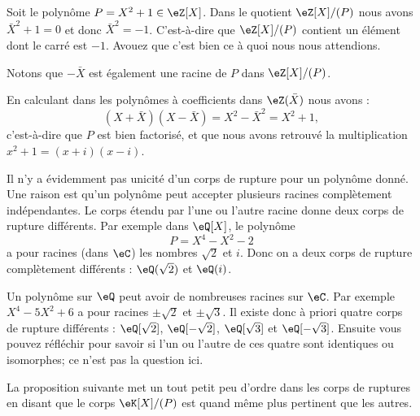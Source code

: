 \begin{example}
	Soit le polynôme \( P=X^2+1\in \eZ[X]\). Dans le quotient \( \eZ[X]/(P)\) nous avons \( \bar X^2+1=0\) et donc \( \bar X^2=-1\). C'est-à-dire que \( \eZ[X]/(P)\) contient un élément dont le carré est \( -1\). Avouez que c'est bien ce à quoi nous nous attendions.

	Notons que \( -\bar X\) est également une racine de \( P\) dans \( \eZ[X]/(P)\).

	En calculant dans les polynômes à coefficients dans \( \eZ(\bar X)\) nous avons :
	\begin{equation}
		(X+\bar X)(X-\bar X)=X^2-\bar X^2=X^2+1,
	\end{equation}
	c'est-à-dire que \( P\) est bien factorisé, et que nous avons retrouvé la multiplication \( x^2+1=(x+i)(x-i)\).
\end{example}

\begin{normaltext}
	Il n'y a évidemment pas unicité d'un corps de rupture pour un polynôme donné. Une raison est qu'un polynôme peut accepter plusieurs racines complètement indépendantes. Le corps étendu par l'une ou l'autre racine donne deux corps de rupture différents. Par exemple dans \( \eQ[X]\), le polynôme
	\begin{equation}
		P=X^4-X^2-2
	\end{equation}
	a pour racines (dans \( \eC\)) les nombres \( \sqrt{ 2 }\) et \( i\). Donc on a deux corps de rupture complètement différents : \( \eQ(\sqrt{ 2 })\) et \( \eQ(i)\).
\end{normaltext}

\begin{normaltext}		\label{NORMooIQIRooEoDjwm}
	Un polynôme sur \( \eQ\) peut avoir de nombreuses racines sur \( \eC\). Par exemple \( X^4-5X^2+6\) a pour racines \( \pm\sqrt{ 2 }\) et \( \pm\sqrt{3}\). Il existe donc à priori quatre corps de rupture différents : \( \eQ[\sqrt{ 2 }]\), \( \eQ[-\sqrt{ 2 }]\), \( \eQ[\sqrt{ 3 }]\) et \( \eQ[-\sqrt{ 3 }]\). Ensuite vous pouvez réfléchir pour savoir si l'un ou l'autre de ces quatre sont identiques ou isomorphes; ce n'est pas la question ici.

	La proposition suivante met un tout petit peu d'ordre dans les corps de ruptures en disant que le corps \( \eK[X]/(P)\) est quand même plus pertinent que les autres.
\end{normaltext}


